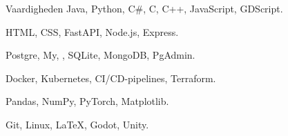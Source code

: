 \begin{rubric}{Vaardigheden}
        Java, Python, C\#, C, C++, JavaScript, GDScript.

        \textsc{HTML, CSS}, FastAPI, Node.js, Express.

        Postgre, My, , SQLite, MongoDB, PgAdmin.

        Docker, Kubernetes, CI/CD-pipelines, Terraform.

        Pandas, NumPy, PyTorch, Matplotlib.

        Git, Linux, LaTeX, Godot, Unity.
\end{rubric}
